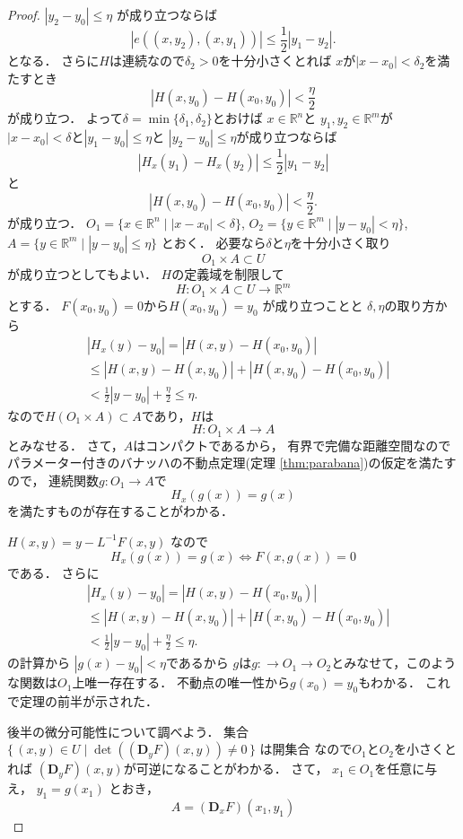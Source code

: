 \documentclass[leqno, a4paper, 12pt]{jsarticle}
\newcommand{\rr}{\mathbb{R}}
\newcommand{\ddd}{\mathbf{D}}
\begin{document}
\begin{proof}
$|y_{2}-y_{0}|\le \eta$
が成り立つならば
\[
 |e((x, y_{2}), (x, y_{1}))|\le \frac{1}{2}|y_{1}-y_{2}|. 
\]
となる．
さらに$H$は連続なので$\delta_{2}>0$を十分小さくとれば
$x$が$|x-x_{0}|<\delta_{2}$を満たすとき
\[
|H(x, y_{0})-H(x_{0}, y_{0})|<\frac{\eta}{2}
\]
が成り立つ．
よって$\delta=\min\{\delta_{1}, \delta_{2}\}$とおけば
$x\in \rr^{n}$と
$y_{1}, y_{2}\in \rr^{m}$が
$|x-x_{0}|<\delta$と$|y_{1}-y_{0}|\le \eta$と
$|y_{2}-y_{0}|\le \eta$が成り立つならば
\[
|H_{x}(y_{1})-H_{x}(y_{2})|\le \frac{1}{2}|y_{1}-y_{2}|
\]
と
\[
|H(x, y_{0})-H(x_{0}, y_{0})|<\frac{\eta}{2}. 
\]
が成り立つ．
$O_{1}=\{x\in \rr^{n}\mid |x-x_{0}|<\delta\}$, 
$O_{2}=\{y\in \rr^{m}\mid |y-y_{0}|<\eta\}$, 
$A=\{y\in \rr^{m}\mid |y-y_{0}|\le\eta\}$
とおく．
必要なら$\delta$と$\eta$を十分小さく取り
\[
O_{1}\times A\subset U
\]
が成り立つとしてもよい．
$H$の定義域を制限して
\[
H: O_{1}\times A\subset U\to \rr^{m}
\]
とする．
$F(x_{0}, y_{0})=0$から$H(x_{0}, y_{0})=y_{0}$
が成り立つことと
$\delta, \eta$の取り方から
\begin{align*}
&|H_{x}(y)-y_{0}|=|H(x, y)-H(x_{0}, y_{0})|\\
&\le |H(x, y)-H(x, y_{0})|+|H(x, y_{0})-H(x_{0}, y_{0})|\\
&<\frac{1}{2}|y-y_{0}|+\frac{\eta}{2}\le \eta. 
\end{align*}
なので$H(O_{1}\times A)\subset A$であり，$H$は
\[
H: O_{1}\times A\to A
\]
とみなせる．
さて，$A$はコンパクトであるから，
有界で完備な距離空間なのでパラメーター付きのバナッハの不動点定理(定理 \ref{thm:parabana})の仮定を満たすので，
連続関数$g: O_{1}\to A$で
\[
H_{x}(g(x))=g(x)
\]
を満たすものが存在することがわかる．

$H(x, y)=y-L^{-1}F(x, y)$
なので
\[
H_{x}(g(x))=g(x)\iff F(x, g(x))=0
\]
である．
さらに
\begin{align*}
&|H_{x}(y)-y_{0}|=|H(x, y)-H(x_{0}, y_{0})|\\
&\le |H(x, y)-H(x, y_{0})|+|H(x, y_{0})-H(x_{0}, y_{0})|\\
&<\frac{1}{2}|y-y_{0}|+\frac{\eta}{2}\le \eta. 
\end{align*}
の計算から
$|g(x)-y_{0}|<\eta$であるから
$g$は$g: \to O_{1}\to O_{2}$とみなせて，このような関数は$O_{1}$上唯一存在する．
不動点の唯一性から$g(x_{0})=y_{0}$もわかる．
これで定理の前半が示された．

後半の微分可能性について調べよう．
集合
$
\{\, (x, y)\in U\mid \det((\ddd_{y}F)(x, y))\neq 0\, \}
$
は開集合
なので$O_{1}$と$O_{2}$を小さくとれば
$(\ddd_{y}F)(x, y)$が可逆になることがわかる．
さて，
$x_{1}\in O_{1}$を任意に与え，
$y_{1}=g(x_{1})$
とおき，
\[
A=(\ddd_{x} F)(x_{1}, y_{1})
\]


\end{proof}
\end{document}
